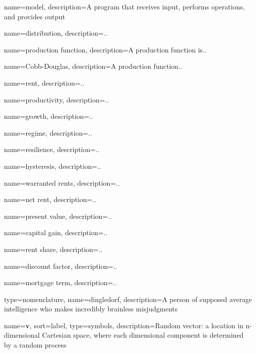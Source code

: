 {
name=model,
description={A program that receives input, performs operations, 
						and provides output}
}

{
name=distribution,
description={..}
}

{
name=production function,
description={A production function is..}
}

{
name=Cobb-Douglas,
description={A production function..}
}

{
name=rent,
description={..}
}

{
name=productivity,
description={..}
}

{
name=growth,
description={..}
}

{
name=regime,
description={..}
}

{
name=resilience,
description={..}
}

{
name=hysteresis,
description={..}
}

{
name=warranted rents,
description={..}
}

{
name=net rent,
description={..}
}

{
name=present value,
description={..}
}

{
name=capital gain,
description={..}
}


{
name=rent share,
description={..}
}


{
name=discount factor,
description={..}
}

{
name=mortgage term,
description={..}
}

{
type=nomenclature,
name=dingledorf,
description={A person of supposed average intelligence who makes incredibly brainless misjudgments}
}



{
name={$\mathbf{v}$},
sort={label},
type=symbols,
description={Random vector: a location in n-dimensional Cartesian space, where each dimensional component is determined by a random process}
}